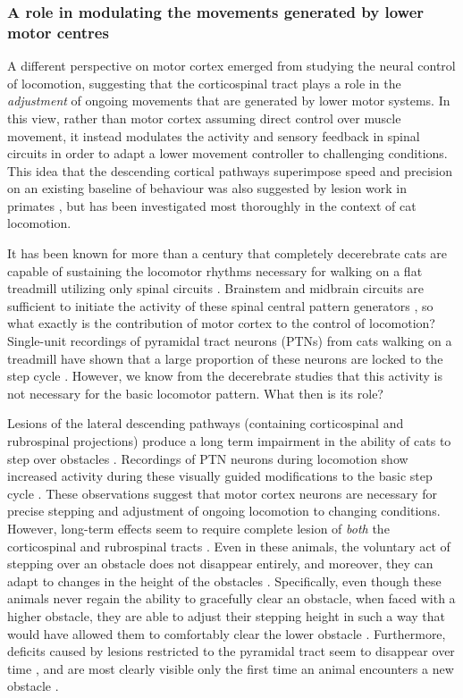 \subsubsection*{A role in modulating the movements generated by lower motor centres}

A different perspective on motor cortex emerged from studying the neural control of locomotion, suggesting that the corticospinal tract plays a role in the \emph{adjustment} of ongoing movements that are generated by lower motor systems. In this view, rather than motor cortex assuming direct control over muscle movement, it instead modulates the activity and sensory feedback in spinal circuits in order to adapt a lower movement controller to challenging conditions. This idea that the descending cortical pathways superimpose speed and precision on an existing baseline of behaviour was also suggested by lesion work in primates \cite{Lawrence1968a}, but has been investigated most thoroughly in the context of cat locomotion.

It has been known for more than a century that completely decerebrate cats are capable of sustaining the locomotor rhythms necessary for walking on a flat treadmill utilizing only spinal circuits \cite{GrahamBrown1911}. Brainstem and midbrain circuits are sufficient to initiate the activity of these spinal central pattern generators \cite{Grillner1973}, so what exactly is the contribution of motor cortex to the control of locomotion? Single-unit recordings of pyramidal tract neurons (PTNs) from cats walking on a treadmill have shown that a large proportion of these neurons are locked to the step cycle \cite{Armstrong1984a}. However, we know from the decerebrate studies that this activity is not necessary for the basic locomotor pattern. What then is its role?

Lesions of the lateral descending pathways (containing corticospinal and rubrospinal projections) produce a long term impairment in the ability of cats to step over obstacles \cite{Drew2002}. Recordings of PTN neurons during locomotion show increased activity during these visually guided modifications to the basic step cycle \cite{Drew1996}. These observations suggest that motor cortex neurons are necessary for precise stepping and adjustment of ongoing locomotion to changing conditions. However, long-term effects seem to require complete lesion of \emph{both} the corticospinal and rubrospinal tracts \cite{Drew2002}. Even in these animals, the voluntary act of stepping over an obstacle does not disappear entirely, and moreover, they can adapt to changes in the height of the obstacles \cite{Drew2002}. Specifically, even though these animals never regain the ability to gracefully clear an obstacle, when faced with a higher obstacle, they are able to adjust their stepping height in such a way that would have allowed them to comfortably clear the lower obstacle \cite{Drew2002}. Furthermore, deficits caused by lesions restricted to the pyramidal tract seem to disappear over time \cite{Liddell1944}, and are most clearly visible only the first time an animal encounters a new obstacle \cite{Liddell1944}.

